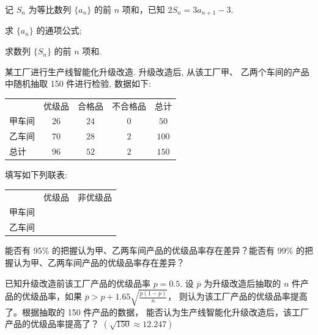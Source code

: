 \documentclass[UTF8,12pt]{ctexart}
\begin{document}
\begin{questions}[start=17]

  \item 记 $S_{n}$ 为等比数列 $\{a_{n}\}$ 的前 $n$ 项和，已知 $2S_{n}=3a_{n+1}-3$.

    \begin{subquestions}
      \item
      求 $\{a_{n}\}$ 的通项公式;
      \item
      求数列 $\{S_{n}\}$ 的前 $n$ 项和.
    \end{subquestions}

  \item 某工厂进行生产线智能化升级改造. 升级改造后, 从该工厂甲、
    乙两个车间的产品中随机抽取 150 件进行检验, 数据如下:

    \begin{center}
      \begin{tabular}{lcccc}
        \toprule
               & 优级品 & 合格品 & 不合格品 & 总计 \\
        甲车间 & $26$   & $24$   & $0$      & $50$ \\
        乙车间 & $70$   & $28$   & $2$      & $100$ \\
        总计   & $96$   & $52$   & $2$      & $150$ \\
        \bottomrule
      \end{tabular}
    \end{center}

    \begin{subquestions}
      \item
      填写如下列联表:

        \begin{center}
          \begin{tabular}{lcc}
            \toprule
                   & 优级品 & 非优级品 \\
            甲车间 &        &  \\
            乙车间 &        &  \\
            \bottomrule
          \end{tabular}
        \end{center}

      能否有 95\% 的把握认为甲、乙两车间产品的优级品率存在差异？能否有 99\%
        的把握认为甲、乙两车间产品的优级品率存在差异？
      \item
      已知升级改造前该工厂产品的优级品率 $p = 0.5$. 设 $\overline{p}$ 为升级改造后抽取的
        $n$ 件产品的优级品率，如果 $\overline{p} > p + 1.65\sqrt{\frac{p(1 - p)}{n}}$，
        则认为该工厂产品的优级品率提高了。根据抽取的 150 件产品的数据，
        能否认为生产线智能化升级改造后，该工厂产品的优级品率提高了？
        $(\sqrt{150} \approx 12.247)$
    \end{subquestions}


\end{questions}
\end{document}
